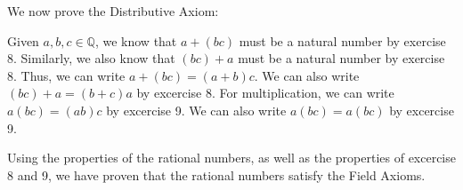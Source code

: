 \documentclass[addpoints]{exam}
\begin{document}
\begin{questions}
We now prove the Distributive Axiom:

Given $a, b, c \in \mathbb{Q}$, we know that $a + (bc)$ must be a natural number by
exercise 8. Similarly, we also know that $(bc) + a$ must be a natural number by exercise 8.
Thus, we can write $a + (bc) = (a + b)c$. We can also write $(bc) + a = (b + c)a$ by excercise 8.
For multiplication, we can write $a(bc) = (ab)c$ by excercise 9. We can also write $a(bc) = a(bc)$
by excercise 9.

Using the properties of the rational numbers, as well as the properties of excercise 
8 and 9, we have proven that the rational numbers satisfy the Field Axioms. 



\end{questions}
\end{document}
